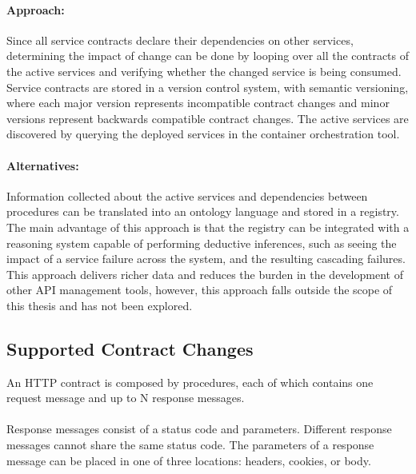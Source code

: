 \paragraph{Approach:}
Since all service contracts declare their dependencies on other services, determining the impact of change can be done by
looping over all the contracts of the active services and verifying whether the changed service is being consumed.
Service contracts are stored in a version control system, with semantic versioning, where
each major version represents incompatible contract changes and minor versions represent backwards compatible contract changes.
The active services are discovered by querying the deployed services in the container orchestration tool.

\paragraph{Alternatives:}
Information collected about the active services and dependencies between procedures can be translated into an ontology language and stored in a registry.
The main advantage of this approach is that the registry can be integrated with a reasoning system capable of performing deductive inferences, such as
seeing the impact of a service failure across the system, and the resulting cascading failures.
This approach delivers richer data and reduces the burden in the development of other API management tools,
however, this approach falls outside the scope of this thesis and has not been explored.

\subsection{Supported Contract Changes} %
\label{sec:supported_contract_changes}

An HTTP contract is composed by procedures, each of which contains one request message and up to N response messages.

\paragraph{}

Response messages consist of a status code and parameters.
Different response messages cannot share the same status code.
The parameters of a response message can be placed in one of three locations: headers, cookies, or body.

\paragraph{}

